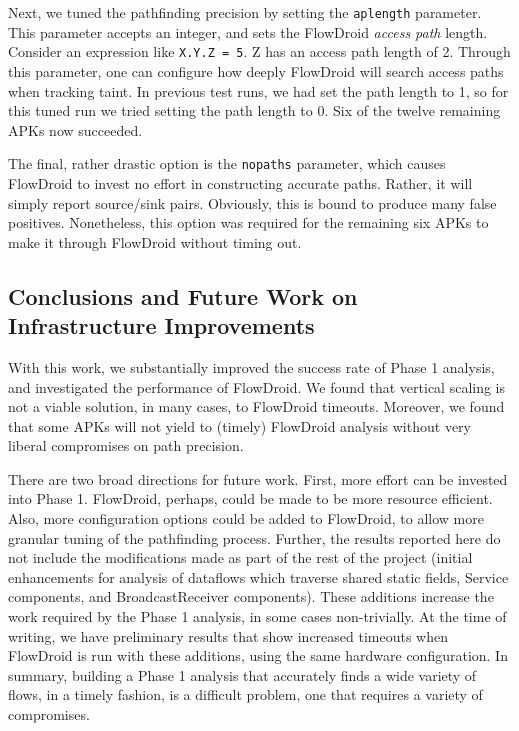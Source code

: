 Next, we tuned the pathfinding precision by setting the \texttt{aplength} parameter.  This parameter accepts an integer, and sets the FlowDroid \emph{access path} length.  Consider an expression like \texttt{X.Y.Z = 5}.  Z has an access path length of 2.  Through this parameter, one can configure how deeply FlowDroid will search access paths when tracking taint.  In previous test runs, we had set the path length to 1, so for this tuned run we tried setting the path length to 0.  Six of the twelve remaining APKs now succeeded. 

The final, rather drastic option is the \texttt{nopaths} parameter, which causes FlowDroid to invest no effort in constructing accurate paths.  Rather, it will simply report source/sink pairs.  Obviously, this is bound to produce many false positives.  Nonetheless, this option was required for the remaining six APKs to make it through FlowDroid without timing out.

\subsection{Conclusions and Future Work on Infrastructure Improvements}
With this work, we substantially improved the success rate of Phase 1 analysis, and investigated the performance of FlowDroid.  We found that vertical scaling is not a viable solution, in many cases, to FlowDroid timeouts.  Moreover, we found that some APKs will not yield to (timely) FlowDroid analysis without very liberal compromises on path precision.

There are two broad directions for future work.  First, more effort can be invested into Phase 1.  FlowDroid, perhaps, could be made to be more resource efficient.  Also, more configuration options could be added to FlowDroid, to allow more granular tuning of the pathfinding process.  Further, the results reported here do not include the modifications made as part of the rest of the project (initial enhancements for analysis of dataflows which traverse shared static fields, Service components, and BroadcastReceiver components).  These additions increase the work required by the Phase 1 analysis, in some cases non-trivially.  At the time of writing, we have preliminary results that show increased timeouts when FlowDroid is run with these additions, using the same hardware configuration.  In summary, building a Phase 1 analysis that accurately finds a wide variety of flows, in a timely fashion, is a difficult problem, one that requires a variety of compromises. 

